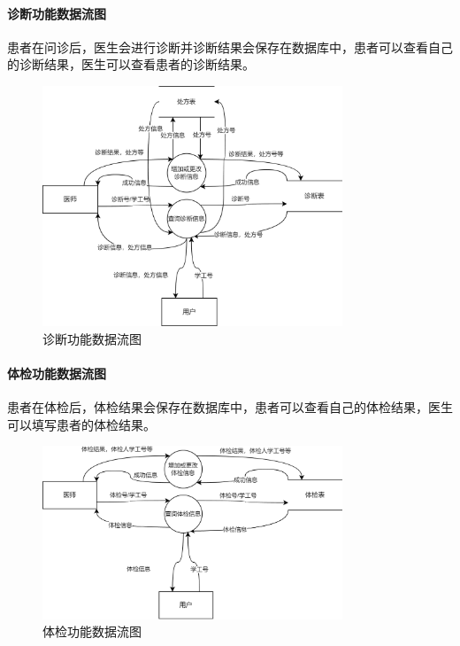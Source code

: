 \documentclass{article}
\begin{document}
\paragraph{诊断功能数据流图}

患者在问诊后，医生会进行诊断并诊断结果会保存在数据库中，患者可以查看自己的诊断结果，医生可以查看患者的诊断结果。

\begin{figure}[H]
    \centering
    \includegraphics[width=0.8\textwidth]{images/diagnosis_dataflow.png}
    \caption{诊断功能数据流图}
\end{figure}

\paragraph{体检功能数据流图}

患者在体检后，体检结果会保存在数据库中，患者可以查看自己的体检结果，医生可以填写患者的体检结果。

\begin{figure}[H]
    \centering
    \includegraphics[width=0.8\textwidth]{images/examination_dataflow.png}
    \caption{体检功能数据流图}
\end{figure}
\end{document}
